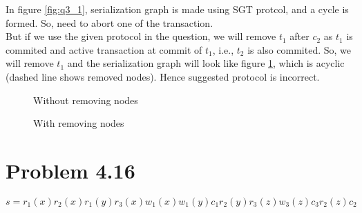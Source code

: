 \documentclass[12pt]{article}
\begin{document}
In figure \ref{fig:q3_1}, serialization graph is made using SGT protcol, and a cycle is formed. So, need to abort one of the transaction. \\
But if we use the given protocol in the question, we will remove $t_1$ after $c_2$ as $t_1$ is commited and active transaction at commit of $t_1$, i.e.,  $t_2$ is also commited. So, we will remove $t_1$ and the serialization graph will look like figure \ref{fig:q3_2}, which is acyclic (dashed line shows removed nodes). Hence suggested protocol is incorrect.

\begin{figure}[h]
    \centering
    
    \begin{minipage}{0.4\textwidth}
        \centering
        \caption{Without removing nodes}
        \label{fig:q3_1}
    \end{minipage}
    \begin{minipage}{0.4\textwidth}
        \centering
        \caption{With removing nodes}
        \label{fig:q3_2}
    \end{minipage}
\end{figure}

\section*{Problem 4.16}
\begin{equation*}
    s = r_1(x) r_2(x) r_1(y) r_3(x) w_1(x) w_1(y) c_1 r_2(y) r_3(z) w_3(z) c_3 r_2(z) c_2
\end{equation*}
\end{document}
